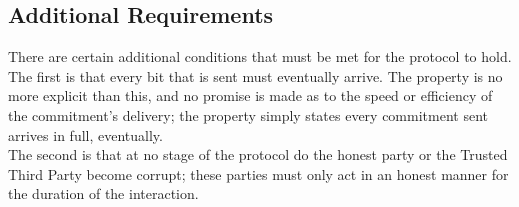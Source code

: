 \documentclass{l4proj}
\begin{document}
\subsection{Additional Requirements}
There are certain additional conditions that must be met for the protocol to hold. The first is that every bit that is sent must eventually arrive. The property is no more explicit than this, and no promise is made as to the speed or efficiency of the commitment's delivery; the property simply states every commitment sent arrives in full, eventually.\\
The second is that at no stage of the protocol do the honest party or the Trusted Third Party become corrupt; these parties must only act in an honest manner for the duration of the interaction.


\end{document}

